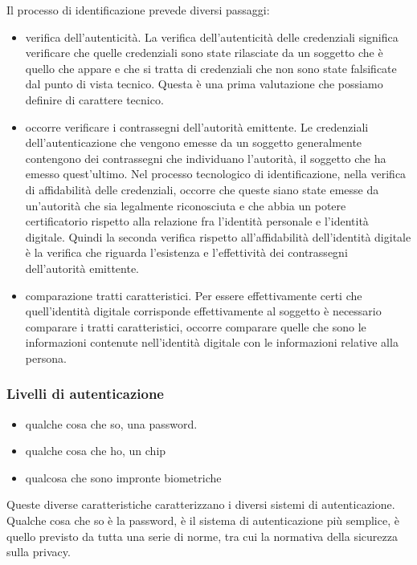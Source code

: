 Il processo di identificazione prevede diversi passaggi:
\begin{itemize}
    \item verifica dell'autenticità. La verifica dell'autenticità delle credenziali significa verificare che quelle credenziali sono state rilasciate da un soggetto che è quello che appare e che si tratta di credenziali che non sono state falsificate dal punto di vista tecnico. Questa è una prima valutazione che possiamo definire di carattere tecnico.
    \item occorre verificare i contrassegni dell'autorità emittente. Le credenziali dell'autenticazione che vengono emesse da un soggetto generalmente contengono dei contrassegni che individuano l'autorità, il soggetto che ha emesso quest'ultimo. Nel processo tecnologico di identificazione, nella verifica di affidabilità delle credenziali, occorre che queste siano state emesse da un'autorità che sia legalmente riconosciuta e che abbia un potere certificatorio rispetto alla relazione fra l'identità personale e l'identità digitale. Quindi la seconda verifica rispetto all'affidabilità dell'identità digitale è la verifica che riguarda l'esistenza e l'effettività dei contrassegni dell'autorità emittente.
    \item comparazione tratti caratteristici. Per essere effettivamente certi che quell'identità digitale corrisponde effettivamente al soggetto è necessario comparare i tratti caratteristici, occorre comparare quelle che sono le informazioni contenute nell'identità digitale con le informazioni relative alla persona.
\end{itemize}

\subsubsection{Livelli di autenticazione}

\begin{itemize}
    \item qualche cosa che so, una password.
    \item qualche cosa che ho, un chip
    \item qualcosa che sono impronte biometriche
\end{itemize}
Queste diverse caratteristiche caratterizzano i diversi sistemi di autenticazione. Qualche cosa che so è la password, è il sistema di autenticazione più semplice, è quello previsto da tutta una serie di norme, tra cui la normativa della sicurezza sulla privacy.

